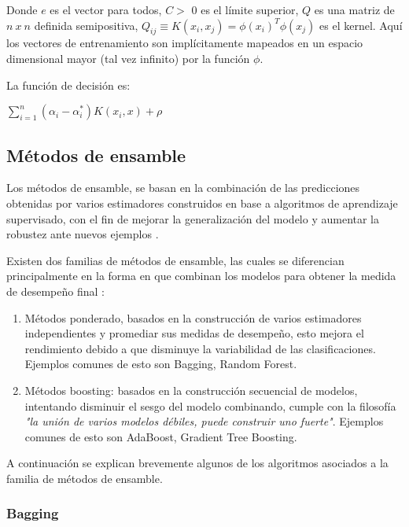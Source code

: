 Donde $e$ es el vector para todos, $C >$ 0 es el límite superior, $Q$ es una matriz de $n\ x\ n$ definida semipositiva, $Q_{ij} \equiv K(x_i, x_j) = \phi (x_i)^T \phi (x_j)$ es el kernel. Aquí los vectores de
entrenamiento son implícitamente mapeados en un espacio dimensional mayor (tal vez infinito) por
la función $\phi$.

La función de decisión es:

\begin{center}
	$\sum_{i=1}^n (\alpha_i - \alpha_i^*) K(x_i, x) + \rho$
\end{center}

\subsection{Métodos de ensamble}

Los métodos de ensamble, se basan en la combinación de las predicciones obtenidas por varios estimadores construidos en base a algoritmos de aprendizaje supervisado, con el fin de mejorar la generalización del modelo y aumentar la robustez ante nuevos ejemplos \cite{dietterich2000ensemble}.

Existen dos familias de métodos de ensamble, las cuales se diferencian principalmente en la forma en que combinan los modelos para obtener la medida de desempeño final \cite{kotsiantis2007supervised}:

\begin{enumerate}
	
	\item Métodos ponderado, basados en la construcción de varios estimadores independientes y promediar sus medidas de desempeño, esto mejora el rendimiento debido a que disminuye la variabilidad de las clasificaciones. Ejemplos comunes de esto son Bagging, Random Forest.
	
	\item Métodos boosting: basados en la construcción secuencial de modelos, intentando disminuir el sesgo del modelo combinando, cumple con la filosofía \textit{"la unión de varios modelos débiles, puede construir uno fuerte"}. Ejemplos comunes de esto son AdaBoost, Gradient Tree Boosting.
	
\end{enumerate}

A continuación se explican brevemente algunos de los algoritmos asociados a la familia de métodos de ensamble.

\subsubsection{Bagging}

